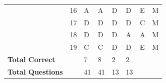 \documentclass[pageno]{final_paper}
\begin{document}
\begin{table}[]
\begin{tabular}{llllllll}
\textbf{}                & 16              & A                       & A                      & D                       & D                       & E                       & M                   \\
\textbf{}                & 17              & D                       & D                      & D                       & D                       & C                       & M                   \\
\textbf{}                & 18              & D                       & D                      & D                       & A                       & A                       & M                   \\
\textbf{}                & 19              & C                       & C                      & D                       & D                       & E                       & M                   \\ \midrule
\textbf{Total Correct}   &                 & 7                       & 8                      & 2                       & 2                       &                         &                     \\
\textbf{Total Questions} &                 & 41                      & 41                     & 13                      & 13                      &                         &                     \\ \bottomrule
\end{tabular}
\end{table}
\end{document}
